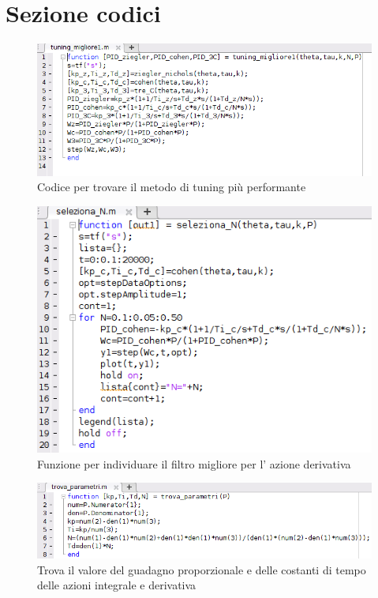 \documentclass[Lau,noexaminfo]{sapthesis}
\begin{document}
	\chapter{Sezione codici}
	\begin{figure}
		\centering
		\includegraphics[scale=0.6]{tuning_migliore}
		\caption{Codice per trovare il metodo di tuning più performante}
	\end{figure}
	\begin{figure}
		\centering
		\includegraphics[scale=0.6]{seleziona_n}
		\caption{Funzione per individuare il filtro migliore per l' azione derivativa}
	\end{figure}
	\begin{figure}
		\centering
		\includegraphics[scale=0.6]{trova_parametri}
		\caption{Trova il valore del guadagno proporzionale e delle costanti di tempo delle azioni integrale e derivativa}
	\end{figure}
\end{document}
